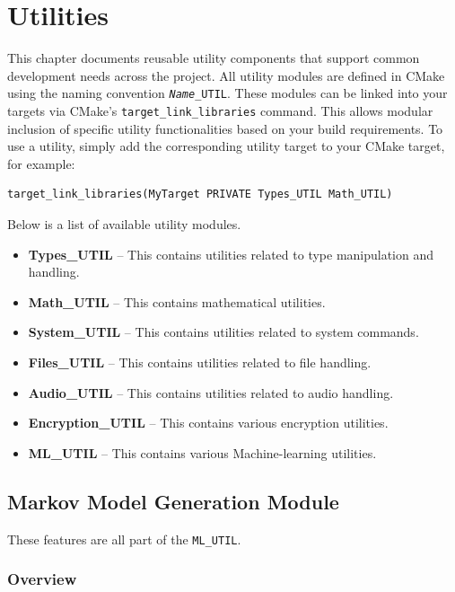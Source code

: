 \chapter{Utilities}
\label{chapter:utilities}

This chapter documents reusable utility components that support common development needs across the project. All utility modules are defined in CMake using the naming convention \texttt{\textit{Name}\_UTIL}. These modules can be linked into your targets via CMake's \texttt{target\_link\_libraries} command. This allows modular inclusion of specific utility functionalities based on your build requirements. To use a utility, simply add the corresponding utility target to your CMake target, for example:
\begin{lstlisting}[style=cppstyle]
target_link_libraries(MyTarget PRIVATE Types_UTIL Math_UTIL)
\end{lstlisting}
Below is a list of available utility modules.
\begin{itemize}\itemsep0em
	\item \textbf{Types\_UTIL} – This contains utilities related to type manipulation and handling.
	\item \textbf{Math\_UTIL} – This contains mathematical utilities.
	\item \textbf{System\_UTIL} – This contains utilities related to system commands.
	\item \textbf{Files\_UTIL} – This contains utilities related to file handling.
	\item \textbf{Audio\_UTIL} – This contains utilities related to audio handling.
	\item \textbf{Encryption\_UTIL} – This contains various encryption utilities.
	\item \textbf{ML\_UTIL} – This contains various Machine-learning utilities.
\end{itemize}









\section{Markov Model Generation Module}

These features are all part of the \texttt{ML\_UTIL}.

\subsection{Overview}

